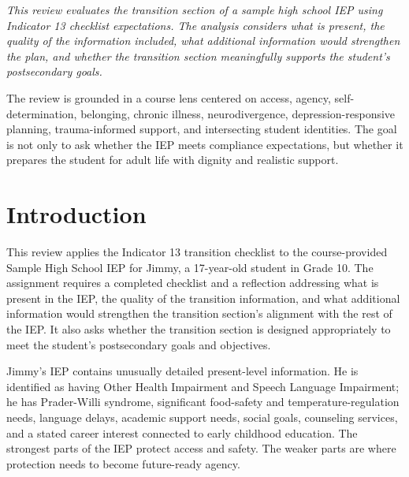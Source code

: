\begin{titlepage}
\vspace{0.34in}

\begin{center}
\begin{minipage}{0.86\textwidth}
\itshape
This review evaluates the transition section of a sample high school IEP using Indicator 13 checklist expectations. The analysis considers what is present, the quality of the information included, what additional information would strengthen the plan, and whether the transition section meaningfully supports the student's postsecondary goals.

\vspace{0.18in}

The review is grounded in a course lens centered on access, agency, self-determination, belonging, chronic illness, neurodivergence, depression-responsive planning, trauma-informed support, and intersecting student identities. The goal is not only to ask whether the IEP meets compliance expectations, but whether it prepares the student for adult life with dignity and realistic support.
\end{minipage}
\end{center}

\restoregeometry
\end{titlepage}
\clearpage
\onehalfspacing

\section*{Introduction}

This review applies the Indicator 13 transition checklist to the course-provided Sample High School IEP for Jimmy, a 17-year-old student in Grade 10. The assignment requires a completed checklist and a reflection addressing what is present in the IEP, the quality of the transition information, and what additional information would strengthen the transition section's alignment with the rest of the IEP. It also asks whether the transition section is designed appropriately to meet the student's postsecondary goals and objectives.

Jimmy's IEP contains unusually detailed present-level information. He is identified as having Other Health Impairment and Speech Language Impairment; he has Prader-Willi syndrome, significant food-safety and temperature-regulation needs, language delays, academic support needs, social goals, counseling services, and a stated career interest connected to early childhood education. The strongest parts of the IEP protect access and safety. The weaker parts are where protection needs to become future-ready agency.

